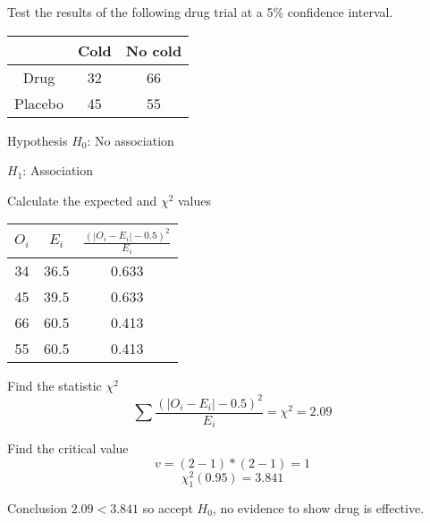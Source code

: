         \begin{example}
        {
            Test the results of the following drug trial at a 5\% confidence interval.
            
            \begin{center}
            \begin{tabular}{c|c|c}
                        & Cold  & No cold   \\
                \hline
                Drug    & 32    & 66        \\
                Placebo & 45    & 55        \\
            \end{tabular}
            \end{center}
        }
        
        
        \begin{step}{Hypothesis}
        $H_0$: No association
        
        $H_1$: Association
        \end{step}
        
        \begin{step}{Calculate the expected and $\chi^2$ values}
        \begin{center}
        \begin{tabular}{c|c|c}
            $O_i$ & $E_i$ & $\displaystyle\frac{(|O_i - E_i| - 0.5)^2}{E_i}$    \\[2ex]
            \hline
            \rule{0pt}{3.5ex} 
            34    & 36.5  & 0.633                                               \\[1ex]
            45    & 39.5  & 0.633                                               \\[1ex]
            66    & 60.5  & 0.413                                               \\[1ex]
            55    & 60.5  & 0.413                                               \\[1ex]
        \end{tabular}
        \end{center}
        \end{step}
        
        \begin{step}{Find the statistic $\chi^2$}
        $$\sum{\frac{(|O_i - E_i| - 0.5)^2}{E_i}} = \chi^2 = 2.09$$
        \end{step}
        
        \begin{step}{Find the critical value}
        $$v = (2-1)*(2-1) = 1$$
        $$\chi^2_1(0.95) = 3.841$$
        \end{step}
        
        \begin{step}{Conclusion}
        $2.09 < 3.841$ so accept $H_0$, no evidence to show drug is effective.
        \end{step}
        
        \end{example}
